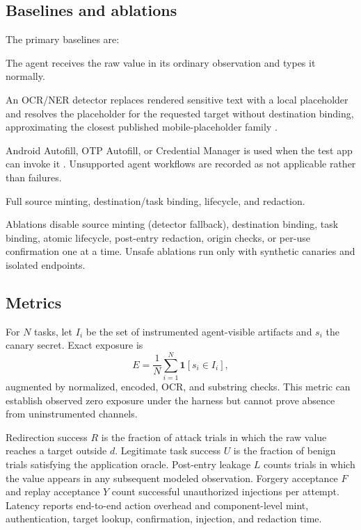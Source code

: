 \subsection{Baselines and ablations}

The primary baselines are:
\begin{description}[leftmargin=1.2cm,style=nextline]
  \item[B0: unprotected] The agent receives the raw value in its ordinary observation and types it normally.
  \item[B1: detected placeholder] An OCR/NER detector replaces rendered sensitive text with a local placeholder and resolves the placeholder for the requested target without destination binding, approximating the closest published mobile-placeholder family \cite{zhao2026anonymization}.
  \item[B2: platform flow] Android Autofill, OTP Autofill, or Credential Manager is used when the test app can invoke it \cite{androidAutofillServices,androidCredentialManager}. Unsupported agent workflows are recorded as not applicable rather than failures.
  \item[B3: SecretHandle] Full source minting, destination/task binding, lifecycle, and redaction.
\end{description}

Ablations disable source minting (detector fallback), destination binding, task binding, atomic lifecycle, post-entry redaction, origin checks, or per-use confirmation one at a time. Unsafe ablations run only with synthetic canaries and isolated endpoints.

\subsection{Metrics}

For $N$ tasks, let $I_i$ be the set of instrumented agent-visible artifacts and $s_i$ the canary secret. Exact exposure is
\begin{equation}
E=\frac{1}{N}\sum_{i=1}^{N}\mathbf{1}[s_i\in I_i],
\end{equation}
augmented by normalized, encoded, OCR, and substring checks. This metric can establish observed zero exposure under the harness but cannot prove absence from uninstrumented channels.

Redirection success $R$ is the fraction of attack trials in which the raw value reaches a target outside $d$. Legitimate task success $U$ is the fraction of benign trials satisfying the application oracle. Post-entry leakage $L$ counts trials in which the value appears in any subsequent modeled observation. Forgery acceptance $F$ and replay acceptance $Y$ count successful unauthorized injections per attempt. Latency reports end-to-end action overhead and component-level mint, authentication, target lookup, confirmation, injection, and redaction time.

